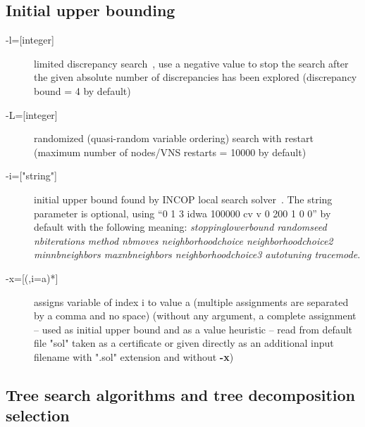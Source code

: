 \documentclass{article}
\begin{document}
\subsection{Initial upper bounding}

\begin{description}
\item[{-l=[integer]}] limited discrepancy search~\cite{Ginsberg95}, use a negative value to stop the search after the given absolute number of discrepancies has been explored (discrepancy bound = 4 by default)
\item[{-L=[integer]}] randomized (quasi-random variable ordering) search with restart (maximum number of nodes/VNS restarts = 10000 by default)
\item[{-i=["string"]}] initial upper bound found by INCOP local search
  solver~\cite{idwalk:cp04}. The string parameter is optional, using ``0 1 3 idwa 100000
  cv v 0 200 1 0 0'' by default with the following meaning:
  {\em stoppinglowerbound randomseed nbiterations method nbmoves
  neighborhoodchoice neighborhoodchoice2 minnbneighbors maxnbneighbors
  neighborhoodchoice3 autotuning tracemode}.
\item[{-x=[(,i=a)*]}] assigns variable of index i to value a (multiple
  assignments are separated by a comma and no space) (without any
  argument, a complete assignment -- used as initial upper bound and
  as a value heuristic -- read from default file "sol" taken as a certificate or given directly as an additional input
  filename with ".sol" extension and without {\bf -x})
\end{description}

\subsection{Tree search algorithms and tree decomposition selection}
\end{document}
